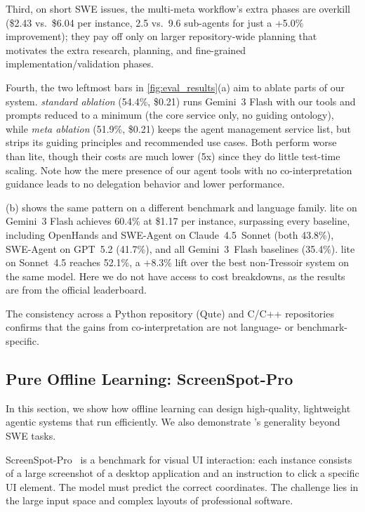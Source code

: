 Third, on short SWE issues, the multi-meta workflow's extra phases are overkill (\$2.43 vs.\ \$6.04 per instance, 2.5 vs.\ 9.6 sub-agents for just a +5.0\% improvement); they pay off only on larger repository-wide planning that motivates the extra research, planning, and fine-grained implementation/validation phases.

Fourth, the two leftmost bars in \cref{fig:eval_results}(a) aim to ablate parts of our system. \emph{standard ablation} (54.4\%, \$0.21) runs Gemini~3 Flash with our tools and prompts reduced to a minimum (the core service only, no guiding ontology), while \emph{meta ablation} (51.9\%, \$0.21) keeps the agent management service list, but strips its guiding principles and recommended use cases. Both perform worse than \sysname lite, though their costs are much lower (5x) since they do little test-time scaling. Note how the mere presence of our agent tools with no co-interpretation guidance leads to no delegation behavior and lower performance.


(b) shows the same pattern on a different benchmark and language family. \sysname lite on Gemini~3 Flash achieves 60.4\% at \$1.17 per instance, surpassing every baseline, including OpenHands and SWE-Agent on Claude~4.5~Sonnet (both 43.8\%), SWE-Agent on GPT~5.2 (41.7\%), and all Gemini~3~Flash baselines (35.4\%). \sysname lite on Sonnet~4.5 reaches 52.1\%, a +8.3\% lift over the best non-Tressoir system on the same model. Here we do not have access to cost breakdowns, as the results are from the official leaderboard.

The consistency across a Python repository (Qute) and C/C++ repositories confirms that the gains from co-interpretation are not language- or benchmark-specific.

\subsection{Pure Offline Learning: ScreenSpot-Pro}
\label{sec:eval_offline}
In this section, we show how offline learning can design high-quality, lightweight agentic systems that run efficiently. We also demonstrate \sysname's generality beyond SWE tasks.

ScreenSpot-Pro~\cite{screenspotpro2025} is a benchmark for visual UI interaction: each instance consists of a large screenshot of a desktop application and an instruction to click a specific UI element. The model must predict the correct coordinates. The challenge lies in the large input space and complex layouts of professional software.

